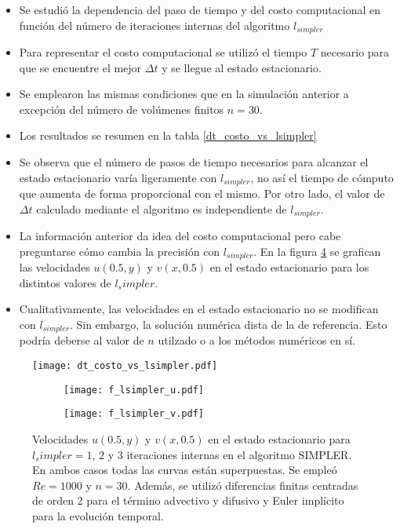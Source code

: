 \documentclass[aps,prb,twocolumn,superscriptaddress,floatfix,longbibliography,10pt]{revtex4-2}
\newcounter{para}
\begin{document}
\begin{itemize}
  \item Se estudió la dependencia del paso de tiempo y del costo computacional en función del número de iteraciones internas del algoritmo $l_{simpler}$
  \item Para representar el costo computacional se utilizó el tiempo $T$ necesario para que se encuentre el mejor $\Delta t$ y se llegue al estado estacionario.
  \item Se emplearon las mismas condiciones que en la simulación anterior a excepción del número de volúmenes finitos $n = 30$.
  \item Los resultados se resumen en la tabla \ref{dt_costo_vs_lsimpler}
  \item Se observa que el número de pasos de tiempo necesarios para alcanzar el estado estacionario varía ligeramente con $l_{simpler}$, no así el tiempo de cómputo que aumenta de forma proporcional con el mismo. Por otro lado, el valor de $\Delta t$ calculado mediante el algoritmo es independiente de $l_{simpler}$.
  \item La información anterior da idea del costo computacional pero cabe preguntarse cómo cambia la precisión con $l_{simpler}$. En la figura \ref{fig:lsimpler} se grafican las velocidades $u(0.5,y)$ y $v(x,0.5)$ en el estado estacionario para los distintos valores de $l_simpler$.
  \item Cualitativamente, las velocidades en el estado estacionario no se modifican con $l_{simpler}$. Sin embargo, la solución numérica dista de la de referencia. Esto podría deberse al valor de $n$ utilzado o a los métodos numéricos en sí.
\end{itemize}

\begin{figure}[h]
  \texttt{[image: dt\_costo\_vs\_lsimpler.pdf]}
  \caption{}
   \label{fig:dt_costo_vs_lsimpler}
\end{figure}

\begin{figure}
  \centering
  \begin{subfigure}[b]{0.3\textwidth}
      \centering
      \texttt{[image: f\_lsimpler\_u.pdf]}
      \caption{}
      \label{fig:lsimpler_u}
  \end{subfigure}
  \hfill
  \begin{subfigure}[b]{0.3\textwidth}
      \centering
      \texttt{[image: f\_lsimpler\_v.pdf]}
      \caption{}
      \label{fig:lsimpler_v}
  \end{subfigure}
     \caption{Velocidades $u(0.5,y)$ y $v(x,0.5)$ en el estado estacionario para $l_simpler = 1$, $2$ y $3$ iteraciones internas en el algoritmo SIMPLER. En ambos casos todas las curvas están superpuestas. Se empleó $Re = 1000$ y $n = 30$. Además, se utilizó diferencias finitas centradas de orden 2 para el término advectivo y difusivo y Euler implícito para la evolución temporal.}
     \label{fig:lsimpler}
\end{figure}
\end{document}
